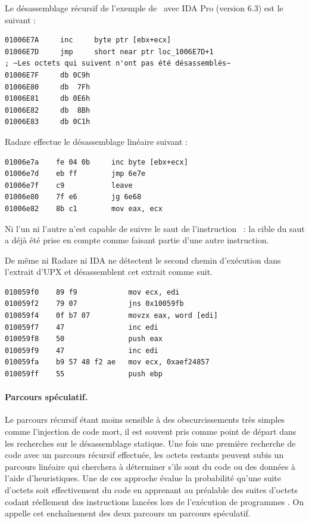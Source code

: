 Le désassemblage récursif de l'exemple de \telock\ avec IDA Pro (version 6.3) \cite{IDA} est le suivant :
\begin{lstlisting}[language={[x86masm]Assembler}, escapechar=~]
01006E7A     inc     byte ptr [ebx+ecx]
01006E7D     jmp     short near ptr loc_1006E7D+1
; ~Les octets qui suivent n'ont pas été désassemblés~
01006E7F     db 0C9h
01006E80     db  7Fh
01006E81     db 0E6h
01006E82     db  8Bh
01006E83     db 0C1h
\end{lstlisting}
Radare \cite{radare} effectue le désassemblage linéaire suivant :
\begin{lstlisting}[language={[x86masm]Assembler}, escapechar=~]
01006e7a    fe 04 0b     inc byte [ebx+ecx]
01006e7d    eb ff        jmp 6e7e
01006e7f    c9           leave
01006e80    7f e6        jg 6e68
01006e82    8b c1        mov eax, ecx
\end{lstlisting}
Ni l'un ni l'autre n'est capable de suivre le saut de l'instruction \jmp\ : la cible du saut a déjà été prise en compte comme faisant partie d'une autre instruction.

De même ni Radare ni IDA ne détectent le second chemin d'exécution dans l'extrait d'UPX et désassemblent cet extrait comme suit.
\begin{lstlisting}[language={[x86masm]Assembler}, escapechar=~]
010059f0    89 f9            mov ecx, edi
010059f2    79 07            jns 0x10059fb
010059f4    0f b7 07         movzx eax, word [edi]
010059f7    47               inc edi
010059f8    50               push eax
010059f9    47               inc edi
010059fa    b9 57 48 f2 ae   mov ecx, 0xaef24857
010059ff    55               push ebp
\end{lstlisting}

\paragraph{Parcours spéculatif.}
Le parcours récursif étant moins sensible à des obscurcissements très simples comme l'injection de code mort, il est souvent pris comme point de départ dans les recherches sur le désassemblage statique.
Une fois une première recherche de code avec un parcours récursif effectuée, les octets restants peuvent subis un parcours linéaire qui cherchera à déterminer s'ils sont du code ou des données à l'aide d'heuristiques.
Une de ces approche évalue la probabilité qu'une suite d'octets soit effectivement du code en apprenant au préalable des suites d'octets codant réellement des instructions lancées lors de l'exécution de programmes \cite{KDF09}.
On appelle cet enchaînement des deux parcours un parcours spéculatif.

